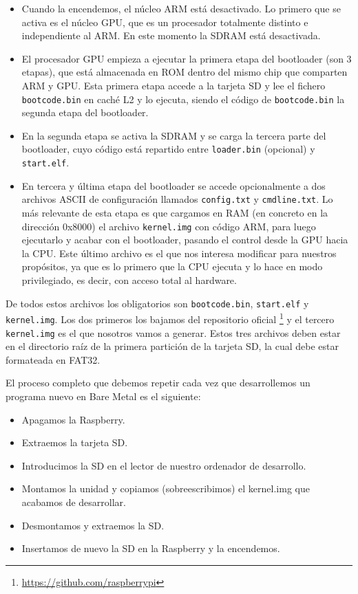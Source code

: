 \begin{itemize}
  \item Cuando la encendemos, el núcleo ARM está desactivado. Lo primero que se activa es el
        núcleo GPU, que es un procesador totalmente distinto e independiente al ARM. En este
        momento la SDRAM está desactivada.
  \item El procesador GPU empieza a ejecutar la primera etapa del bootloader (son 3 etapas), que
        está almacenada en ROM dentro del mismo chip que comparten ARM y GPU. Esta primera etapa
        accede a la tarjeta SD y lee el fichero {\tt bootcode.bin} en caché L2 y lo ejecuta,
        siendo el código de {\tt bootcode.bin} la segunda etapa del bootloader.
  \item En la segunda etapa se activa la SDRAM y se carga la tercera parte del bootloader, cuyo
        código está repartido entre {\tt loader.bin} (opcional) y {\tt start.elf}.
  \item En tercera y última etapa del bootloader se accede opcionalmente a dos archivos ASCII de
        configuración llamados {\tt config.txt} y {\tt cmdline.txt}. Lo más relevante de esta
        etapa es que cargamos en RAM (en concreto en la dirección 0x8000) el archivo
        {\tt kernel.img} con código ARM, para luego ejecutarlo y acabar con el bootloader, pasando
        el control desde la GPU hacia la CPU.
        Este último archivo es el que nos interesa modificar para nuestros propósitos, ya que es
        lo primero que la CPU ejecuta y lo hace en modo privilegiado, es decir, con acceso total
        al hardware.
\end{itemize}

De todos estos archivos los obligatorios son {\tt bootcode.bin}, {\tt start.elf} y
{\tt kernel.img}. Los dos primeros los bajamos del repositorio oficial
\footnote{\url{https://github.com/raspberrypi}} y el tercero {\tt kernel.img} es el que nosotros
vamos a generar. Estos tres archivos deben estar en el directorio raíz de la primera partición
de la tarjeta SD, la cual debe estar formateada en FAT32.

El proceso completo que debemos repetir cada vez que desarrollemos un programa nuevo
en Bare Metal es el siguiente:

\begin{itemize}
  \item Apagamos la Raspberry.
  \item Extraemos la tarjeta SD.
  \item Introducimos la SD en el lector de nuestro ordenador de desarrollo.
  \item Montamos la unidad y copiamos (sobreescribimos) el kernel.img que acabamos
        de desarrollar.
  \item Desmontamos y extraemos la SD.
  \item Insertamos de nuevo la SD en la Raspberry y la encendemos.
\end{itemize}


